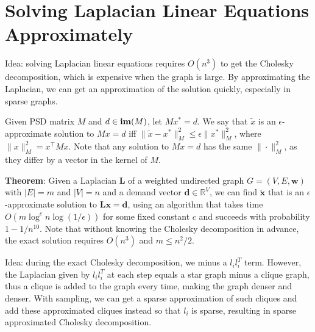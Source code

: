 \section{Solving Laplacian Linear Equations Approximately}

Idea: solving Laplacian linear equations requires $O(n^3)$ to get the Cholesky decomposition, which is expensive when the graph is large. By approximating the Laplacian, we can get an approximation of the solution quickly, especially in sparse graphs.

Given PSD matrix $M$ and $d \in \operatorname{\textbf{im}}(M)$, let $M x^* = d$. We say that $\tilde{x}$ is an $\epsilon$-approximate solution to $Mx=d$ iff $\|\tilde{x} - x^*\|_M^2 \le \epsilon \|x^*\|_M^2$, where $\|x\|_M^2 = x^\top M x$. Note that any solution to $M x = d$ has the same $\|\cdot\|_M^2$, as they differ by a vector in the kernel of $M$.

\textbf{Theorem}: Given a Laplacian $\boldsymbol{L}$ of a weighted undirected graph $G=(V, E, \boldsymbol{w})$ with $|E|=m$ and $|V|=n$ and a demand vector $\boldsymbol{d} \in \mathbb{R}^{V}$, we can find $\tilde{\boldsymbol{x}}$ that is an $\epsilon$-approximate solution to $\boldsymbol{L x}=\boldsymbol{d}$, using an algorithm that takes time $O\left(m \log ^{c} n \log (1 / \epsilon)\right)$ for some fixed constant $c$ and succeeds with probability $1-1 / n^{10}$. Note that without knowing the Cholesky decomposition in advance, the exact solution requires $O(n^3)$ and $m \le n^2 / 2$.

Idea: during the exact Cholesky decomposition, we minus a $l_i l_i^T$ term. However, the Laplacian given by $l_i l_i^T$ at each step equals a star graph minus a clique graph, thus a clique is added to the graph every time, making the graph denser and denser. With sampling, we can get a sparse approximation of such cliques and add these approximated cliques instead so that $l_i$ is sparse, resulting in sparse approximated Cholesky decomposition.